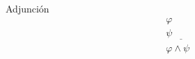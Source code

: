 \begin{ruleinf} \label{relinf_impadd} Adjunción
	\begin{equation}
	\begin{gathered}
	    \varphi \quad \quad \ \  \\
		\underline {\psi \quad \quad \ \ } \\
		\varphi \land \psi 
	\end{gathered}
	\end{equation}
\end{ruleinf}
